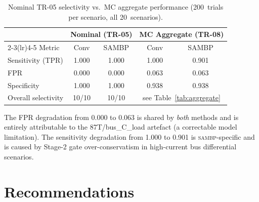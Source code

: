 \documentclass[12pt,a4paper]{article}
\newcommand{\SAMBP}{\textsc{sambp}}
\begin{document}
\begin{table}[ht]
\centering
\caption{Nominal TR-05 selectivity vs.\ MC aggregate performance
  (200~trials per scenario, all 20~scenarios).}
\label{tab:nominal_vs_mc}
\begin{tabular}{lcccc}
\toprule
 & \multicolumn{2}{c}{Nominal (TR-05)} &
   \multicolumn{2}{c}{MC Aggregate (TR-08)} \\
\cmidrule(lr){2-3}\cmidrule(lr){4-5}
Metric & Conv & SAMBP & Conv & SAMBP \\
\midrule
Sensitivity (TPR) & 1.000 & 1.000 & 1.000 & 0.901 \\
FPR               & 0.000 & 0.000 & 0.063 & 0.063 \\
Specificity       & 1.000 & 1.000 & 0.938 & 0.938 \\
\midrule
Overall selectivity & 10/10 & 10/10 & \multicolumn{2}{c}{see Table~\ref{tab:aggregate}}\\
\bottomrule
\end{tabular}
\end{table}

The FPR degradation from 0.000 to 0.063 is shared by \emph{both}
methods and is entirely attributable to the 87T/bus\_C\_load artefact
(a correctable model limitation).  The sensitivity degradation from
1.000 to 0.901 is \SAMBP{}-specific and is caused by Stage-2 gate
over-conservatism in high-current bus differential scenarios.


\section{Recommendations}
\end{document}
